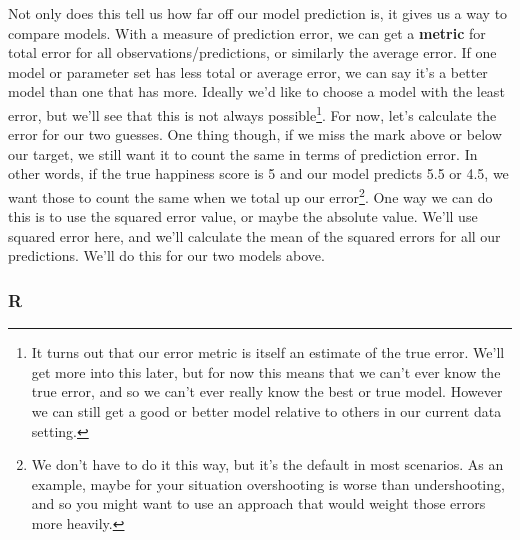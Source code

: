 \documentclass[
  letterpaper,
]{krantz}
\newenvironment{Shaded}{}{}
\newcommand{\CommentTok}[1]{\textcolor[rgb]{0.38,0.63,0.69}{\textit{#1}}}
\newcommand{\DecValTok}[1]{\textcolor[rgb]{0.25,0.63,0.44}{#1}}
\newcommand{\FunctionTok}[1]{\textcolor[rgb]{0.02,0.16,0.49}{#1}}
\newcommand{\NormalTok}[1]{#1}
\newcommand{\OtherTok}[1]{\textcolor[rgb]{0.00,0.44,0.13}{#1}}
\newcommand{\SpecialCharTok}[1]{\textcolor[rgb]{0.25,0.44,0.63}{#1}}
\begin{document}
Not only does this tell us how far off our model prediction is, it gives
us a way to compare models. With a measure of prediction error, we can
get a \textbf{metric} for total error for all observations/predictions,
or similarly the average error. If one model or parameter set has less
total or average error, we can say it's a better model than one that has
more. Ideally we'd like to choose a model with the least error, but
we'll see that this is not always possible\footnote{It turns out that
  our error metric is itself an estimate of the true error. We'll get
  more into this later, but for now this means that we can't ever know
  the true error, and so we can't ever really know the best or true
  model. However we can still get a good or better model relative to
  others in our current data setting.}. For now, let's calculate the
error for our two guesses. One thing though, if we miss the mark above
or below our target, we still want it to count the same in terms of
prediction error. In other words, if the true happiness score is 5 and
our model predicts 5.5 or 4.5, we want those to count the same when we
total up our error\footnote{We don't have to do it this way, but it's
  the default in most scenarios. As an example, maybe for your situation
  overshooting is worse than undershooting, and so you might want to use
  an approach that would weight those errors more heavily.}. One way we
can do this is to use the squared error value, or maybe the absolute
value. We'll use squared error here, and we'll calculate the mean of the
squared errors for all our predictions. We'll do this for our two models
above.

\subsubsection{R}

\begin{Shaded}
\end{Shaded}
\end{document}
